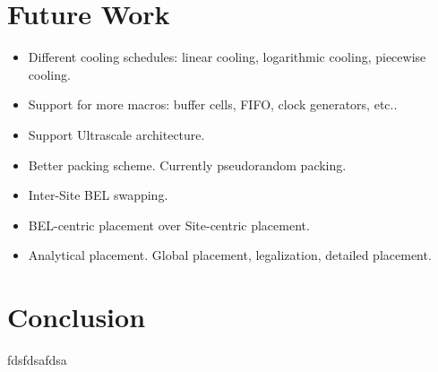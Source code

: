 \documentclass{article}
\begin{document}
\begin{multicols}{2}
\section{Future Work}
    \begin{itemize}
    \item Different cooling schedules: linear cooling, logarithmic cooling, piecewise cooling.
    \item Support for more macros: buffer cells, FIFO, clock generators, etc..
    \item Support Ultrascale architecture. 
    \item Better packing scheme. Currently pseudorandom packing. 
    \item Inter-Site BEL swapping. 
    \item BEL-centric placement over Site-centric placement.
    \item Analytical placement. Global placement, legalization, detailed placement. 
    \end{itemize}

\section{Conclusion}
    fdsfdsafdsa


\end{multicols}
\end{document}
